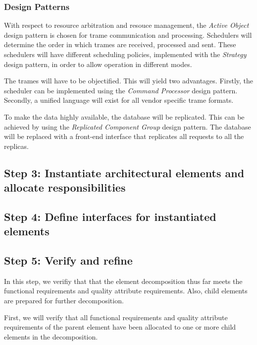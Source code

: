 \subsubsection{Design Patterns}
\label{add:it1/patterns} %

\npar With respect to resource arbitration and resouce management, the
\emph{Active Object} design pattern is chosen for trame communication and
processing. Schedulers will determine the order in which trames are received,
processed and sent. These schedulers will have different scheduling policies,
implemented with the \emph{Strategy} design pattern, in order to allow operation
in different modes.

\npar The trames will have to be objectified. This will yield two advantages.
Firstly, the scheduler can be implemented using the \emph{Command Processor}
design pattern. Secondly, a unified language will exist for all vendor
specific trame formats.

\npar To make the data highly available, the database will be replicated. This
can be achieved by using the \emph{Replicated Component Group} design pattern.
The database will be replaced with a front-end interface that replicates all
requests to all the replicas. 

\subsection{Step 3: Instantiate architectural elements and allocate responsibilities}
\label{add:it1/elements}


\subsection{Step 4: Define interfaces for instantiated elements}
\label{add:it1/interfaces}


\subsection{Step 5: Verify and refine}
\label{add:it1/verification}

\npar In this step, we verifiy that that the element decomposition thus far
meets the functional requirements and quality attribute requirements. Also,
child elements are prepared for further decomposition.

\npar First, we will verify that all functional requirements and quality
attribute requirements of the parent element have been allocated to one or more
child elements in the decomposition.

